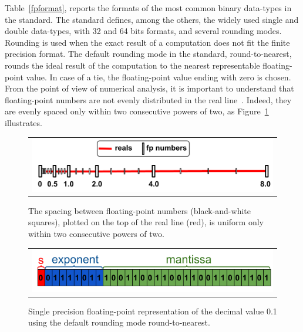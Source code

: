 %
Table~\ref{fpformat}, reports the formats of the most common binary data-types in the standard.
%
The standard defines, among the others, the widely used single and double data-types, with 32 and 64 bits formats, and several rounding modes.
%
Rounding is used when the exact result of a computation does not fit the finite precision format.
%
The default rounding mode in the standard, round-to-nearest, rounds the ideal result of the computation to the nearest representable floating-point value.
%
In case of a tie, the floating-point value ending with zero is chosen.
%
From the point of view of numerical analysis, it is important to understand that floating-point numbers are not evenly distributed in the real line~\cite{every}.
%
%
Indeed, they are evenly spaced only within two consecutive powers of two, as Figure~\ref{fig:line} illustrates.

%
\begin{figure}[tb!]
	\centering
	\begin{tabular}{l}
		\includegraphics[width=1.0\textwidth]{pic/fpnumbers.png}
	\end{tabular}
	\caption{The spacing between floating-point numbers (black-and-white squares), plotted on the top of the real line (red), is uniform only within two consecutive powers of two.}
	\label{fig:line}
\end{figure}
%
\begin{figure}[tb!]
	\centering
	\begin{tabular}{l}
		\includegraphics[width=1.0\textwidth]{pic/examplenumber.png}
	\end{tabular}
	\caption{Single precision floating-point representation of the decimal value 0.1 using the default rounding mode round-to-nearest.}
	\label{fig:zeropointone}
\end{figure}
%

